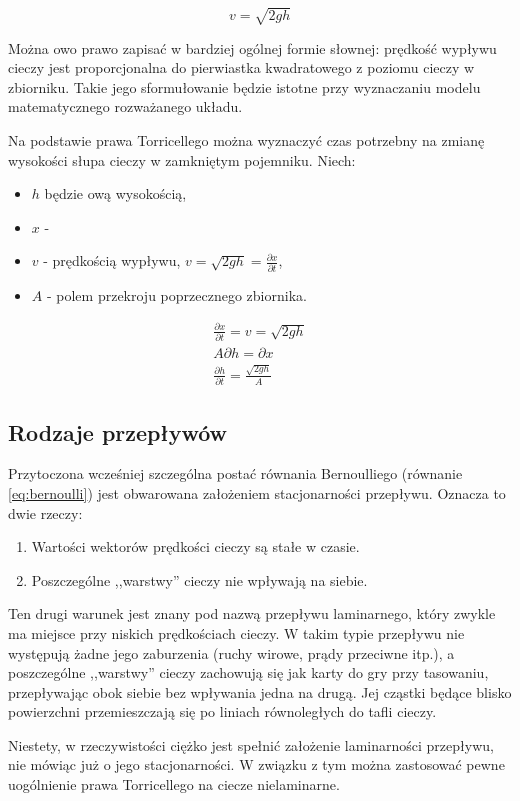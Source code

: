\begin{equation}\label{eq:torricelli}
	v = \sqrt{2gh}
\end{equation}

Można owo prawo zapisać w bardziej ogólnej formie słownej:
prędkość wypływu cieczy jest proporcjonalna do pierwiastka kwadratowego z poziomu cieczy w zbiorniku. Takie jego sformułowanie będzie istotne przy wyznaczaniu modelu matematycznego rozważanego układu.

Na podstawie prawa Torricellego można wyznaczyć czas potrzebny na zmianę wysokości słupa cieczy w zamkniętym pojemniku. Niech:
\begin{itemize}
    \item $h$ będzie ową wysokością,
    \item $x$ -  
    \item $v$ - prędkością wypływu, $v = \sqrt{2gh} = \frac{\partial x}{\partial t}$,
    \item $A$ - polem przekroju poprzecznego zbiornika.
\end{itemize}

\begin{equation}
    \begin{array}{lr}
        \frac{\partial x}{\partial t} = v = \sqrt{2gh} \\
        A \partial h = \partial x \\
        \frac{\partial h}{\partial t} = \frac{\sqrt{2gh}}{A}
    \end{array}
\end{equation}



\subsection{Rodzaje przepływów}
\label{sub:plyny-przeplywy}

Przytoczona wcześniej szczególna postać równania Bernoulliego (równanie \ref{eq:bernoulli}) jest obwarowana założeniem stacjonarności przepływu. Oznacza to dwie rzeczy:
\begin{enumerate}
    \item Wartości wektorów prędkości cieczy są stałe w czasie.
    \item Poszczególne ,,warstwy'' cieczy nie wpływają na siebie.
\end{enumerate}

Ten drugi warunek jest znany pod nazwą przepływu laminarnego, który zwykle ma miejsce przy niskich prędkościach cieczy. W takim typie przepływu nie występują żadne jego zaburzenia (ruchy wirowe, prądy przeciwne itp.), a poszczególne ,,warstwy'' cieczy zachowują się jak karty do gry przy tasowaniu, przepływając obok siebie bez wpływania jedna na drugą. Jej cząstki będące blisko powierzchni przemieszczają się po liniach równoległych do tafli cieczy.

Niestety, w rzeczywistości ciężko jest spełnić założenie laminarności przepływu, nie mówiąc już o jego stacjonarności. W związku z tym można zastosować pewne uogólnienie prawa Torricellego na ciecze nielaminarne. 